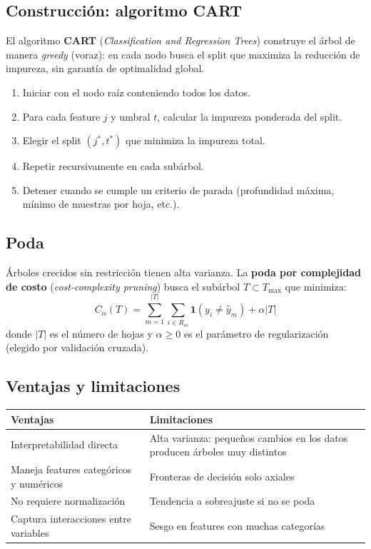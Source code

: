 \documentclass[12pt, a4paper]{article}
\theoremstyle{definition}
\theoremstyle{plain}
\theoremstyle{remark}
\begin{document}
\subsection{Construcción: algoritmo CART}

El algoritmo \textbf{CART} (\textit{Classification and Regression Trees}) construye el árbol de manera \textit{greedy} (voraz): en cada nodo busca el split que maximiza la reducción de impureza, sin garantía de optimalidad global.

\begin{enumerate}
  \item Iniciar con el nodo raíz conteniendo todos los datos.
  \item Para cada feature $j$ y umbral $t$, calcular la impureza ponderada del split.
  \item Elegir el split $(j^*, t^*)$ que minimiza la impureza total.
  \item Repetir recursivamente en cada subárbol.
  \item Detener cuando se cumple un criterio de parada (profundidad máxima, mínimo de muestras por hoja, etc.).
\end{enumerate}

\subsection{Poda}

Árboles crecidos sin restricción tienen alta varianza. La \textbf{poda por complejidad de costo} (\textit{cost-complexity pruning}) busca el subárbol $T \subset T_{\max}$ que minimiza:
\[
  C_\alpha(T) = \sum_{m=1}^{|T|} \sum_{i \in R_m} \mathbf{1}(y_i \neq \hat{y}_m) + \alpha |T|
\]
donde $|T|$ es el número de hojas y $\alpha \geq 0$ es el parámetro de regularización (elegido por validación cruzada).

\subsection{Ventajas y limitaciones}

\begin{center}
\begin{tabular}{p{} p{}}
  \toprule
  \textbf{Ventajas} & \textbf{Limitaciones} \\
  \midrule
  Interpretabilidad directa & Alta varianza: pequeños cambios en los datos producen árboles muy distintos \\
  Maneja features categóricos y numéricos & Fronteras de decisión solo axiales \\
  No requiere normalización & Tendencia a sobreajuste si no se poda \\
  Captura interacciones entre variables & Sesgo en features con muchas categorías \\
  \bottomrule
\end{tabular}
\end{center}
\end{document}
